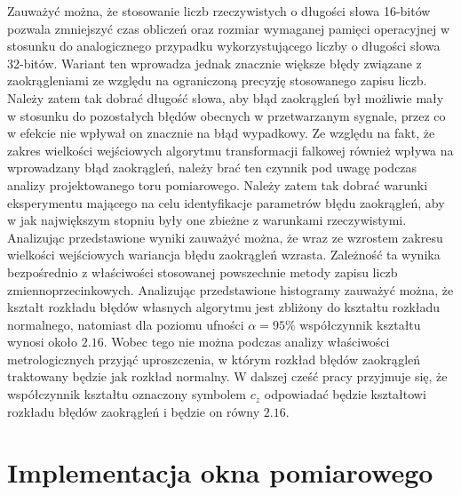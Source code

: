 Zauważyć można, że stosowanie liczb rzeczywistych o długości słowa 16-bitów pozwala zmniejszyć czas obliczeń oraz rozmiar wymaganej pamięci operacyjnej w stosunku do analogicznego przypadku wykorzystującego liczby o długości słowa 32-bitów. Wariant ten wprowadza jednak znacznie większe błędy związane z zaokrągleniami ze względu na ograniczoną precyzję stosowanego zapisu liczb. Należy zatem tak dobrać długość słowa, aby błąd zaokrągleń był możliwie mały w stosunku do pozostałych błędów obecnych w przetwarzanym sygnale, przez co w efekcie nie wpływał on znacznie na błąd wypadkowy. Ze względu na fakt, że zakres wielkości wejściowych algorytmu transformacji falkowej również wpływa na wprowadzany błąd zaokrągleń, należy brać ten czynnik pod uwagę podczas analizy projektowanego toru pomiarowego. Należy zatem tak dobrać warunki eksperymentu mającego na celu identyfikacje parametrów błędu zaokrągleń, aby w jak największym stopniu były one zbieżne z warunkami rzeczywistymi. Analizując przedstawione wyniki zauważyć można, że wraz ze wzrostem zakresu wielkości wejściowych wariancja błędu zaokrągleń wzrasta. Zależność ta wynika bezpośrednio z właściwości stosowanej powszechnie metody zapisu liczb zmiennoprzecinkowych. Analizując przedstawione histogramy zauważyć można, że kształt rozkładu błędów własnych algorytmu jest zbliżony do kształtu rozkładu normalnego, natomiast dla poziomu ufności $\alpha = 95\%$ współczynnik kształtu wynosi około $2.16$. Wobec tego nie można podczas analizy właściwości metrologicznych przyjąć uproszczenia, w którym rozkład błędów zaokrągleń traktowany będzie jak rozkład normalny. W dalszej cześć pracy przyjmuje się, że współczynnik kształtu oznaczony symbolem $c_{z}$ odpowiadać będzie kształtowi rozkładu błędów zaokrągleń i będzie on równy $2.16$.

\section{Implementacja okna pomiarowego}

